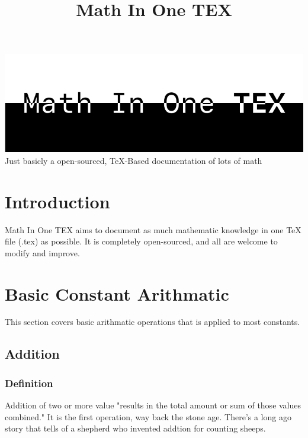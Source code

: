 \documentclass{article}
\title{Math In One TEX}
\begin{document}
    \begin{titlepage}
        \begin{center}

            \includegraphics[scale=0.4]{CoverArt.png} \\
            \vspace{4ex}
            \huge{\textsf{Just basicly a open-sourced, TeX-Based documentation of lots of math}}
        \end{center}
    \end{titlepage}


    \clearpage
    \tableofcontents

    \clearpage
    \section{Introduction}
        Math In One TEX aims to document as much mathematic knowledge in one TeX file (.tex) as possible. It is completely open-sourced, and all are welcome to modify and improve.
    
    
    \clearpage
    \section{Basic Constant Arithmatic}
    This section covers basic arithmatic operations that is applied to most constants.


    \subsection{Addition}
    \label{section:addition}

    \subsubsection{Definition}
    \par
    Addition of two or more value "results in the total amount or sum of those values combined."\cite{addition} It is the first operation, way back the stone age. There's a long ago story that tells of a shepherd who invented addtion for counting sheeps.
    
\end{document}
